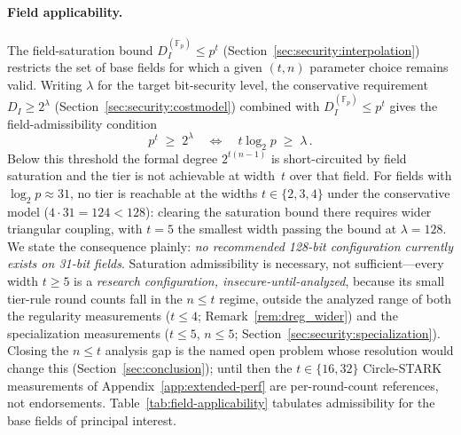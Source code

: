 \documentclass[11pt,a4paper]{article}
\theoremstyle{definition}
\newcommand{\Fp}{\mathbb{F}_p}
\begin{document}
\paragraph{Field applicability.}
The field-saturation bound $D_I^{(\Fp)} \le p^{t}$
(Section~\ref{sec:security:interpolation}) restricts the set of base
fields for which a given $(t, n)$ parameter choice remains valid.
Writing $\lambda$ for the target bit-security level, the conservative
requirement $D_I \ge 2^{\lambda}$
(Section~\ref{sec:security:costmodel}) combined with
$D_I^{(\Fp)} \le p^{t}$ gives the field-admissibility condition
\[
  p^{t} \;\ge\; 2^{\lambda}
  \quad\Longleftrightarrow\quad
  t\log_2 p \;\ge\; \lambda\,.
\]
Below this threshold the formal degree $2^{t(n-1)}$ is short-circuited
by field saturation and the tier is not achievable at width~$t$ over
that field. For fields with $\log_2 p \approx 31$, no tier is
reachable at the widths $t \in \{2, 3, 4\}$ under the conservative
model ($4 \cdot 31 = 124 < 128$): clearing the saturation bound there
requires wider triangular coupling, with $t = 5$ the smallest width
passing the bound at $\lambda = 128$. We state the consequence
plainly: \emph{no recommended 128-bit configuration currently exists
on 31-bit fields}. Saturation admissibility is necessary, not
sufficient---every width $t \ge 5$ is a \emph{research
configuration, insecure-until-analyzed}, because its small tier-rule
round counts fall in the $n \le t$ regime, outside the analyzed
range of both the regularity measurements ($t \le 4$;
Remark~\ref{rem:dreg_wider}) and the specialization measurements
($t \le 5$, $n \le 5$;
Section~\ref{sec:security:specialization}). Closing the $n \le t$
analysis gap is the named open problem whose resolution would change
this (Section~\ref{sec:conclusion}); until then the $t \in \{16,
32\}$ Circle-STARK measurements of Appendix~\ref{app:extended-perf}
are per-round-count references, not endorsements.
Table~\ref{tab:field-applicability} tabulates admissibility for the
base fields of principal interest.
\end{document}
